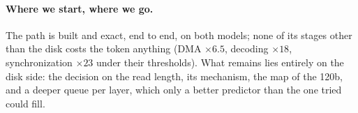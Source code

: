 \paragraph{Where we start, where we go.} The path is built and exact, end to end, on both models; none of its stages other than the disk costs the token anything (DMA $\times 6.5$, decoding $\times 18$, synchronization $\times 23$ under their thresholds). What remains lies entirely on the disk side: the decision on the read length, its mechanism, the map of the 120b, and a deeper queue per layer, which only a better predictor than the one tried could fill.
